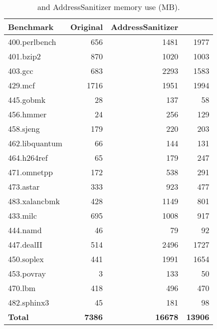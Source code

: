 \begin{table}[h!]
\centering
\begin{tabular}{l|r|r|r}
\textbf{ \small Benchmark} & \textbf{\small Original} &  \textbf{\small AddressSanitizer} & \textbf{\small \doubletake{} } \\
\hline
400.perlbench & 656 &	1481 & 1977 \\
401.bzip2	& 870 &	1020 &	1003 \\
403.gcc	& 683 &	2293 &	1583 \\
429.mcf	& 1716 &	1951 &	1994 \\
445.gobmk &	28 &	137 &	58 \\
456.hmmer &	24 &	256 &	129 \\
458.sjeng & 179 & 220 &	203 \\
462.libquantum	& 66 &	144 &	131 \\
464.h264ref	& 65 &	179 &	247 \\
471.omnetpp	& 172 &	538 &	291 \\
473.astar	& 333 &	923 &	477 \\
483.xalancbmk &	428 & 1149 &	801 \\
433.milc	& 695 &	1008 &	917 \\
444.namd	& 46 &	79 &	92 \\
447.dealII	& 514 &	2496 &	1727 \\
450.soplex	& 441 &	1991 &	1654 \\
453.povray	& 3 &	133 &	50 \\
470.lbm	& 418 &	496 &	470 \\
482.sphinx3 &	45 &	181 & 98 \\
\hline
\textbf{Total} & \textbf{7386} & \textbf{16678} & \textbf{13906} \\
\end{tabular}
\caption{\doubletake{} and AddressSanitizer memory use (MB).\label{tbl:memoryoverhead}}
\end{table}
